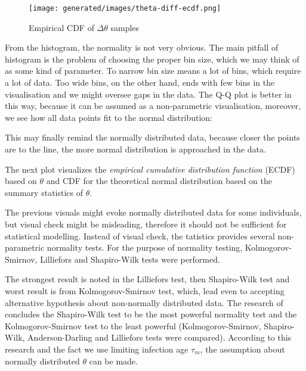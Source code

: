\documentclass[
  digital, %
  oneside, %
  lof,     %
  lot,     %
]{fithesis4}
\begin{document}
\begin{figure}[h]
  \begin{center}
    \texttt{[image: generated/images/theta-diff-ecdf.png]}
  \end{center}
  \caption{Empirical CDF of $\Delta \theta$ samples}
  \label{fig:theta-diff-ecdf}
\end{figure}

From the histogram, the normality is not 
very obvious. 
The main pitfall of histogram is the problem 
of choosing the proper bin size, which we may 
think of as some kind of parameter. 
To narrow bin size means a lot of bins, which 
require a lot of data. 
Too wide bins, on the other hand, ends with 
few bins in the visualisation and we might 
oversee gaps in the data. 
The Q-Q plot is better in this way, because 
it can be assumed as a non-parametric 
visualisation, moreover, we see how all data 
points fit to the normal distribution:

This may finally remind the normally distributed 
data, because closer the points are to the line, 
the more normal distribution is approached in 
the data.

The next plot visualizes the 
\textit{empirical cumulative distribution function}
(ECDF) based on $\theta$ and CDF for the 
theoretical normal distribution based on 
the summary statistics of $\theta$.

The previous visuals might evoke normally 
distributed data for some individuals, but 
visual check might be misleading, therefore 
it should not be sufficient for statistical 
modelling. Instead of visual check, the 
tatistics provides several non-parametric 
normality tests. For the purpose of normality 
testing, Kolmogorov-Smirnov, Lilliefors and 
Shapiro-Wilk tests were performed.





The strongest result is noted in the 
Lilliefors test, then Shapiro-Wilk test and 
worst result is from Kolmogorov-Smirnov test, 
which, lead even to accepting alternative 
hypothesis about non-normally distributed data. 
The research of \cite{razali2011} concludes the 
Shapiro-Wilk test to be the most powerful 
normality test and the Kolmogorov-Smirnov test 
to the least powerful (Kolmogorov-Smirnov, 
Shapiro-Wilk, Anderson-Darling and Lilliefors 
tests were compared). 
According to this research and the fact we 
use limiting infection age $\tau_m$, the 
assumption about normally distributed $\theta$ 
can be made.
\end{document}
